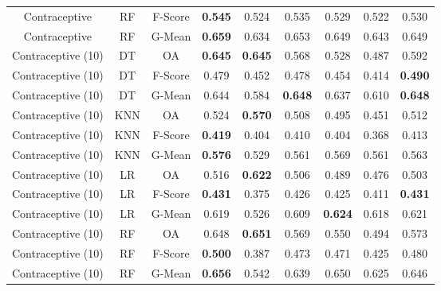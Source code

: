 \begin{longtable}{ccccccccc}
     Contraceptive &         RF & F-Score & \textbf{0.545} &          0.524 &          0.535 &          0.529 &          0.522 &          0.530 \\
     Contraceptive &         RF &  G-Mean & \textbf{0.659} &          0.634 &          0.653 &          0.649 &          0.643 &          0.649 \\
Contraceptive (10) &         DT &      OA & \textbf{0.645} & \textbf{0.645} &          0.568 &          0.528 &          0.487 &          0.592 \\
Contraceptive (10) &         DT & F-Score &          0.479 &          0.452 &          0.478 &          0.454 &          0.414 & \textbf{0.490} \\
Contraceptive (10) &         DT &  G-Mean &          0.644 &          0.584 & \textbf{0.648} &          0.637 &          0.610 & \textbf{0.648} \\
Contraceptive (10) &        KNN &      OA &          0.524 & \textbf{0.570} &          0.508 &          0.495 &          0.451 &          0.512 \\
Contraceptive (10) &        KNN & F-Score & \textbf{0.419} &          0.404 &          0.410 &          0.404 &          0.368 &          0.413 \\
Contraceptive (10) &        KNN &  G-Mean & \textbf{0.576} &          0.529 &          0.561 &          0.569 &          0.561 &          0.563 \\
Contraceptive (10) &         LR &      OA &          0.516 & \textbf{0.622} &          0.506 &          0.489 &          0.476 &          0.503 \\
Contraceptive (10) &         LR & F-Score & \textbf{0.431} &          0.375 &          0.426 &          0.425 &          0.411 & \textbf{0.431} \\
Contraceptive (10) &         LR &  G-Mean &          0.619 &          0.526 &          0.609 & \textbf{0.624} &          0.618 &          0.621 \\
Contraceptive (10) &         RF &      OA &          0.648 & \textbf{0.651} &          0.569 &          0.550 &          0.494 &          0.573 \\
Contraceptive (10) &         RF & F-Score & \textbf{0.500} &          0.387 &          0.473 &          0.471 &          0.425 &          0.480 \\
Contraceptive (10) &         RF &  G-Mean & \textbf{0.656} &          0.542 &          0.639 &          0.650 &          0.625 &          0.646 \\

\end{longtable}
